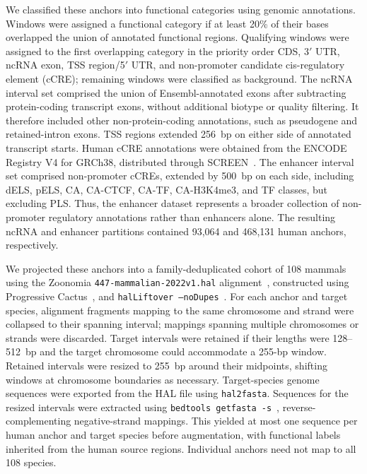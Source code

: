 \documentclass[a4paper,num-refs]{oup-contemporary}
\begin{document}
We classified these anchors into functional categories using genomic
annotations.
Windows were assigned a functional category if at least 20\% of their
bases overlapped the union of annotated functional regions.
Qualifying windows were assigned to the first overlapping category
in the priority order CDS, 3$'$ UTR, ncRNA exon, TSS region/5$'$ UTR,
and non-promoter candidate cis-regulatory element (cCRE);
remaining windows were classified as background.
The ncRNA interval set comprised the union of Ensembl-annotated exons
after subtracting protein-coding transcript exons, without additional
biotype or quality filtering.
It therefore included other non-protein-coding annotations, such as
pseudogene and retained-intron exons.
TSS regions extended 256~bp on either side of annotated transcript starts.
Human cCRE annotations were obtained from the
ENCODE\cite{encode2012integrated,luo2020encode,hitz2023encode,kagda2025encode}
Registry V4 for GRCh38, distributed through SCREEN~\citep{moore2026registry}.
The enhancer interval set comprised non-promoter
cCREs, extended by 500~bp on each side, including dELS, pELS, CA,
CA-CTCF, CA-TF, CA-H3K4me3, and TF classes, but excluding PLS.
Thus, the enhancer dataset represents a broader collection of
non-promoter regulatory annotations rather than enhancers alone.
The resulting ncRNA and enhancer partitions contained 93,064 and
468,131 human anchors, respectively.

We projected these anchors into a family-deduplicated cohort of
108 mammals using the Zoonomia
\texttt{447-mammalian-2022v1.hal} alignment~\citep{cgl2023},
constructed using Progressive Cactus~\citep{armstrong2020cactus},
and \texttt{halLiftover --noDupes}~\citep{hickey2013hal}.
For each anchor and target species, alignment fragments mapping to
the same chromosome and strand were collapsed to their spanning
interval; mappings spanning multiple chromosomes or strands were
discarded.
Target intervals were retained if their lengths were 128--512~bp
and the target chromosome could accommodate a 255-bp window.
Retained intervals were resized to 255~bp around their midpoints,
shifting windows at chromosome boundaries as necessary.
Target-species genome sequences were exported from the HAL file using
\texttt{hal2fasta}. Sequences for the resized intervals were extracted
using \texttt{bedtools getfasta -s}~\citep{quinlan2010bedtools},
reverse-complementing negative-strand mappings.
This yielded at most one sequence per human anchor and target
species before augmentation, with functional labels inherited from
the human source regions. Individual anchors need not map to all 108 species.
\end{document}
